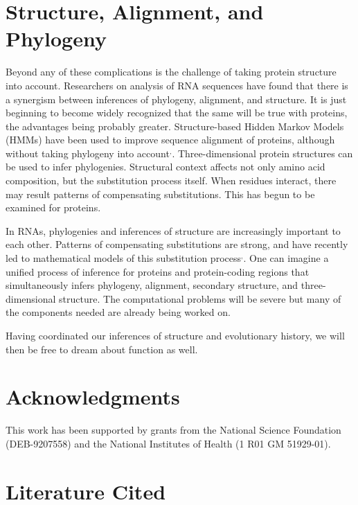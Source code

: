 \documentclass[12pt]{article}
\begin{document}
\section*{Structure, Alignment, and Phylogeny}

Beyond any of these complications is the challenge of taking protein structure
into account.  Researchers on analysis of RNA sequences have found that
there is a synergism between inferences of phylogeny, alignment, and
structure.  It is just beginning to become widely recognized that the same will
be true with proteins, the advantages being probably greater.  Structure-based
Hidden Markov Models (HMMs) have been used to improve sequence alignment of proteins,
although without taking phylogeny into account\footnotemark$^,$\footnotemark.
Three-dimensional protein structures can be used to infer
phylogenies\footnotemark.  Structural context affects not only amino
acid composition, but the substitution process itself\footnotemark.    When residues interact, there may result patterns of compensating
substitutions.  This has begun to be examined for proteins\footnotemark.

In RNAs, phylogenies and inferences of structure are increasingly important
to each other.  Patterns of compensating substitutions are strong, and
have recently led to mathematical models of this substitution process\footnotemark$^,$\footnotemark.
One can imagine a unified
process of inference for proteins and protein-coding regions that
simultaneously infers phylogeny, alignment,
secondary structure, and three-dimensional structure.  The computational
problems will be severe but many of the components needed are already being
worked on.

Having coordinated our inferences of structure and evolutionary history, we
will then be free to dream about function as well.

\section*{Acknowledgments}

This work has been supported by grants from the National Science Foundation
(DEB-9207558) and the National Institutes of Health (1 R01 GM 51929-01).

\section*{Literature Cited}
\end{document}
